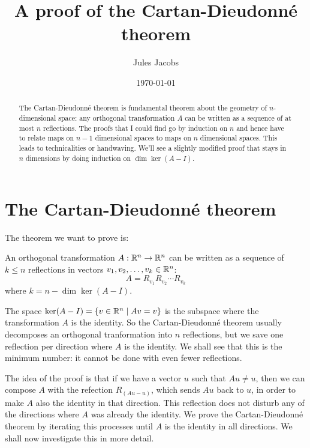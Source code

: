
\newcommand{\id}[1]{\lstinline\|#1\|}

\title{A proof of the Cartan-Dieudonné theorem}
\author{\large{Jules Jacobs}}
\date{\normalsize	\today}

\DeclareMathOperator{\im}{im}


\maketitle

\begin{abstract}
  \noindent
  The Cartan-Dieudonné theorem is fundamental theorem about the geometry of $n$-dimensional space:
  any orthogonal transformation $A$ can be written as a sequence of at most $n$ reflections.
  The proofs that I could find go by induction on $n$ and hence have to relate maps on $n-1$ dimensional spaces to maps on $n$ dimensional spaces.
  This leads to technicalities or handwaving.
  We'll see a slightly modified proof that stays in $n$ dimensions by doing induction on $\dim \ker(A - I)$.
\end{abstract}

\section{The Cartan-Dieudonné theorem}

\newcommand{\V}{\R^n}

The theorem we want to prove is:
\begin{theorem}
  \label{thm:cd}
  An orthogonal transformation $A : \V \to \V$ can be written as a sequence of $k \leq n$ reflections in vectors $v_1,v_2,\dots,v_k \in \V$:
  \[ A = R_{v_1} R_{v_2} \cdots R_{v_k} \]
  where $k = n - \dim \ker (A - I)$.
\end{theorem}

The space $\ker(A - I) = \{ v \in \V \mid Av = v \}$ is the subspace where the transformation $A$ is the identity.
So the Cartan-Dieudonné theorem usually decomposes an orthogonal tranformation into $n$ reflections, but we save one reflection per direction where $A$ is the identity. We shall see that this is the minimum number: it cannot be done with even fewer reflections.

The idea of the proof is that if we have a vector $u$ such that $Au \neq u$, then we can compose $A$ with the refection $R_{(Au - u)}$, which sends $Au$ back to $u$, in order to make $A$ also the identity in that direction.
This reflection does not disturb any of the directions where $A$ was already the identity.
We prove the Cartan-Dieudonné theorem by iterating this processes until $A$ is the identity in all directions.
We shall now investigate this in more detail.

